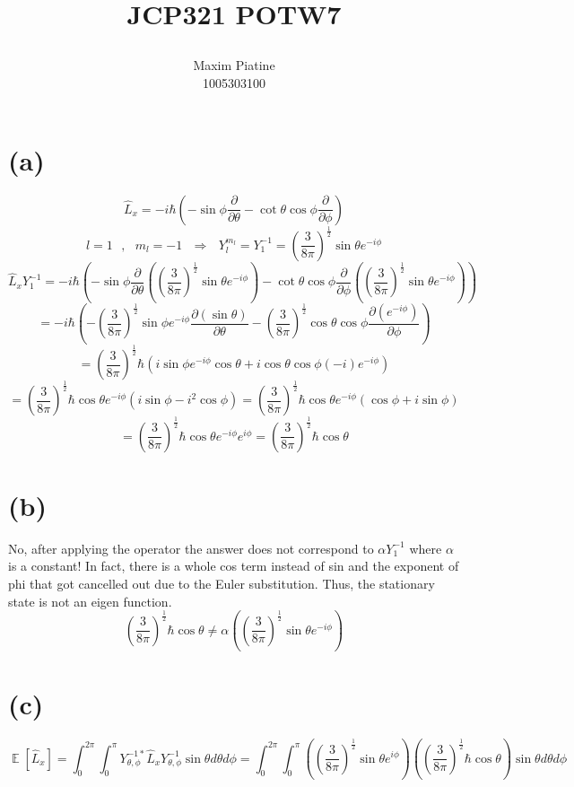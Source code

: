 \documentclass[11pt]{article}
\title{\textbf{JCP321 POTW7}
\author{Maxim Piatine\\1005303100}}
\date{}
\DeclareMathOperator*{\E}{\mathbb{E}}
\begin{document}
\maketitle
\section*{(a)}
\[\hat{L}_x=-i\hbar\left(
-\sin{\phi}\frac{\partial}{\partial \theta}-\cot{\theta}\cos{\phi}\frac{\partial}{\partial \phi}
\right)\]
\[l=1\text{ },\text{ }m_l=-1 \text{ } \Rightarrow \text{ } Y^{m_l}_l=Y^{-1}_{1}=\left(\frac{3}{8\pi}\right)^{\frac{1}{2}}\sin{\theta}e^{-i\phi}\]
\[\hat{L}_xY^{-1}_1=-i\hbar\left(
-\sin{\phi}\frac{\partial}{\partial \theta}\left(\left(\frac{3}{8\pi}\right)^{\frac{1}{2}}\sin{\theta}e^{-i\phi}\right)-\cot{\theta}\cos{\phi}\frac{\partial}{\partial \phi}
\left(\left(\frac{3}{8\pi}\right)^{\frac{1}{2}}\sin{\theta}e^{-i\phi}\right)\right)\]
\[=-i\hbar\left(-\left(\frac{3}{8\pi}\right)^\frac{1}{2}\sin{\phi}e^{-i\phi}\frac{\partial (\sin{\theta})}{\partial \theta}-\left(\frac{3}{8\pi}\right)^{\frac{1}{2}}\cos{\theta}\cos{\phi}\frac{\partial (e^{-i\phi})}{\partial \phi}\right)\]
\[=\left(\frac{3}{8\pi}\right)^{\frac{1}{2}}\hbar\left(
i\sin{\phi}e^{-i\phi}\cos{\theta}+i\cos{\theta}\cos{\phi}(-i)e^{-i\phi}
\right)\]
\[=\left(\frac{3}{8\pi}\right)^{\frac{1}{2}}\hbar\cos{\theta} e^{-i\phi}\left(
i\sin{\phi}-i^2\cos{\phi}
\right)=\left(\frac{3}{8\pi}\right)^{\frac{1}{2}}\hbar\cos{\theta} e^{-i\phi}\left(
\cos{\phi}+i\sin{\phi}
\right)\]
\[=\left(\frac{3}{8\pi}\right)^{\frac{1}{2}}\hbar\cos{\theta} e^{-i\phi}e^{i\phi}=\left(\frac{3}{8\pi}\right)^{\frac{1}{2}}\hbar\cos{\theta}\]
\section*{(b)}
No, after applying the operator the answer does not correspond to $\alpha Y^{-1}_1$ where $\alpha$ is a constant! In fact, there is a whole cos term instead of sin and the exponent of phi that got cancelled out due to the Euler substitution. Thus, the stationary state is not an eigen function. 
\[\left(\frac{3}{8\pi}\right)^{\frac{1}{2}}\hbar\cos{\theta}\neq \alpha\left( \left(\frac{3}{8\pi}\right)^{\frac{1}{2}}\sin{\theta}e^{-i\phi}\right)\]

\section*{(c)}
\[\E\left[\hat{L}_x\right]=\int_0^{2\pi}\int^\pi_0Y^{-1*}_{\theta,\phi}\hat{L}_xY^{-1}_{\theta,\phi}\sin\theta d\theta d\phi=
\int_0^{2\pi}\int^\pi_0\left( \left(\frac{3}{8\pi}\right)^{\frac{1}{2}}\sin{\theta}e^{i\phi}\right)\left(\left(\frac{3}{8\pi}\right)^{\frac{1}{2}}\hbar\cos{\theta}\right)\sin\theta d\theta d\phi\]
\end{document}
